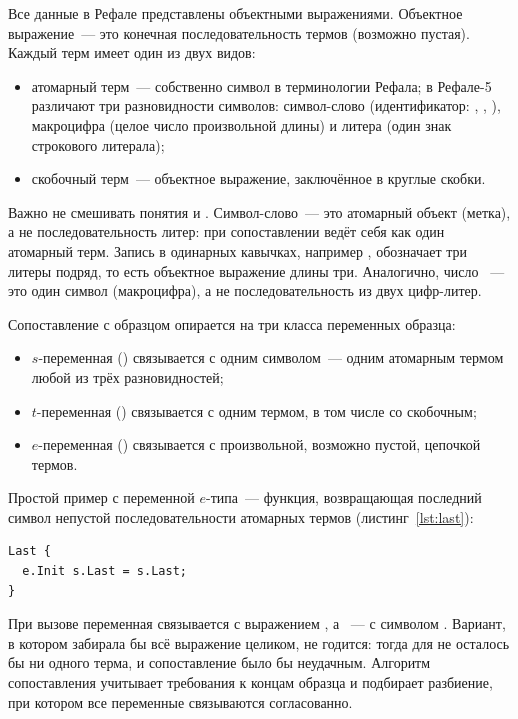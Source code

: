 Все данные в Рефале представлены объектными выражениями.
Объектное выражение~--- это конечная последовательность термов
(возможно пустая). Каждый терм имеет один из двух видов:

\begin{itemize}
  \item атомарный терм~--- собственно символ в терминологии Рефала;
        в Рефале-5 различают три разновидности символов: символ-слово
        (идентификатор: , , ),
        макроцифра (целое число произвольной длины) и литера (один знак
        строкового литерала);
  \item скобочный терм~--- объектное выражение, заключённое в круглые скобки.
\end{itemize}

Важно не смешивать понятия  и . Символ-слово~---
это атомарный объект (метка), а не последовательность литер: при
сопоставлении  ведёт себя как один атомарный терм. Запись в
одинарных кавычках, например , обозначает три литеры подряд,
то есть объектное выражение длины три. Аналогично, число ~--- это
один символ (макроцифра), а не последовательность из двух цифр-литер.

Сопоставление с образцом опирается на три класса переменных образца:

\begin{itemize}
  \item \(s\)-переменная () связывается с одним
        символом~--- одним атомарным термом любой из трёх
        разновидностей;
  \item \(t\)-переменная () связывается с одним
        термом, в том числе со скобочным;
  \item \(e\)-переменная () связывается с произвольной,
        возможно пустой, цепочкой термов.
\end{itemize}

Простой пример с переменной \(e\)-типа~--- функция, возвращающая последний
символ непустой последовательности атомарных термов (листинг~\ref{lst:last}):

\begin{lstlisting}[language=Refal,caption={Функция получения последнего символа},label={lst:last}]
Last {
  e.Init s.Last = s.Last;
}
\end{lstlisting}

При вызове  переменная  связывается с
выражением , а ~--- с символом . Вариант, в
котором  забирала бы всё выражение целиком, не годится:
тогда для  не осталось бы ни одного терма, и сопоставление
было бы неудачным. Алгоритм сопоставления учитывает требования к концам
образца и подбирает разбиение, при котором все переменные связываются
согласованно.

